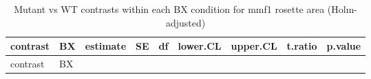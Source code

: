 \documentclass[
  10pt,
]{article}
\begin{document}
\begin{longtable}[]{@{}
  >{\raggedright\arraybackslash}p{}
  >{\raggedright\arraybackslash}p{}
  >{\raggedleft\arraybackslash}p{}
  >{\raggedleft\arraybackslash}p{}
  >{\raggedleft\arraybackslash}p{}
  >{\raggedleft\arraybackslash}p{}
  >{\raggedleft\arraybackslash}p{}
  >{\raggedleft\arraybackslash}p{}
  >{\raggedleft\arraybackslash}p{}@{}}
\caption{Mutant vs WT contrasts within each BX condition for mmf1
rosette area (Holm-adjusted)}\tabularnewline
\toprule\noalign{}
\begin{minipage}[b]{\linewidth}\raggedright
contrast
\end{minipage} & \begin{minipage}[b]{\linewidth}\raggedright
BX
\end{minipage} & \begin{minipage}[b]{\linewidth}\raggedleft
estimate
\end{minipage} & \begin{minipage}[b]{\linewidth}\raggedleft
SE
\end{minipage} & \begin{minipage}[b]{\linewidth}\raggedleft
df
\end{minipage} & \begin{minipage}[b]{\linewidth}\raggedleft
lower.CL
\end{minipage} & \begin{minipage}[b]{\linewidth}\raggedleft
upper.CL
\end{minipage} & \begin{minipage}[b]{\linewidth}\raggedleft
t.ratio
\end{minipage} & \begin{minipage}[b]{\linewidth}\raggedleft
p.value
\end{minipage} \\
\midrule\noalign{}
\endfirsthead
\toprule\noalign{}
\begin{minipage}[b]{\linewidth}\raggedright
contrast
\end{minipage} & \begin{minipage}[b]{\linewidth}\raggedright
BX
\end{minipage} & \begin{minipage}[b]{\linewidth}\raggedleft

\end{minipage}
\end{longtable}
\end{document}
